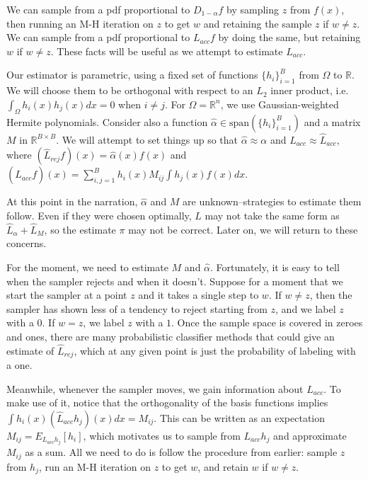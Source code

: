 \documentclass{article}
\begin{document}
We can sample from a pdf proportional to $D_{1-\alpha}f$ by sampling $z$ from $f(x)$, then running an M-H iteration on $z$ to get $w$ and retaining the sample $z$ if $w \neq z$. We can sample from a pdf proportional to $L_{acc}f$ by doing the same, but retaining $w$ if $w \neq z$. These facts will be useful as we attempt to estimate $L_{acc}$.

Our estimator is parametric, using a fixed set of functions $\{h_i\}_{i=1}^B$ from $\Omega$ to $\mathbb{R}$. We will choose them to be orthogonal with respect to an $L_2$ inner product, i.e. $\int_{\Omega} h_i(x)h_j(x)dx = 0$ when $i \neq j$. For $\Omega=\mathbb{R}^n$, we use Gaussian-weighted Hermite polynomials. Consider also a function $\hat{\alpha} \in \text{span}(\{h_i\}_{i=1}^B)$ and a matrix $M$ in $\mathbb{R}^{B\times B}$.  We will attempt to set things up so that $\hat{\alpha}\approx{\alpha}$ and $L_{acc} \approx \hat{L}_{acc}$, where $ (\hat{L}_{rej}f)(x) = \hat{\alpha}(x)f(x)$ and $(\hat{L}_{acc}f)(x) =\sum_{i,j=1}^B h_i(x)M_{ij}\int h_j(x)f(x)dx$. 


At this point in the narration, $\hat{\alpha}$ and $M$ are unknown--strategies to estimate them follow. Even if they were chosen optimally, $L$ may not take the same form as $\hat{L}_{\alpha}+\hat{L}_{M}$, so the estimate $\pi$ may not be correct. Later on, we will return to these concerns.

For the moment, we need to estimate $M$ and $\hat{\alpha}$. Fortunately, it is easy to tell when the sampler rejects and when it doesn't. Suppose for a moment that we start the sampler at a point $z$ and it takes a single step to $w$. If $w \neq z$, then the sampler has shown less of a tendency to reject starting from $z$, and we label $z$ with a $0$. If $w = z$, we label $z$ with a $1$. Once the sample space is covered in zeroes and ones, there are many probabilistic classifier methods that could give an estimate of $\hat{L}_{rej}$, which at any given point is just the probability of labeling with a one. 

Meanwhile, whenever the sampler moves, we gain information about $L_{acc}$. To make use of it, notice that the orthogonality of the basis functions implies $\int h_i(x)(\hat{L}_{acc}h_j)(x)dx =  M_{ij}$. This can be written as an expectation $M_{ij} = E_{L_{acc}h_j}[h_i]$, which motivates us to sample from $L_{acc}h_j$ and approximate $M_{ij}$ as a sum. All we need to do is follow the procedure from earlier: sample $z$ from $h_j$, run an M-H iteration on $z$ to get $w$, and retain $w$ if $w \neq z$. 
\end{document}
